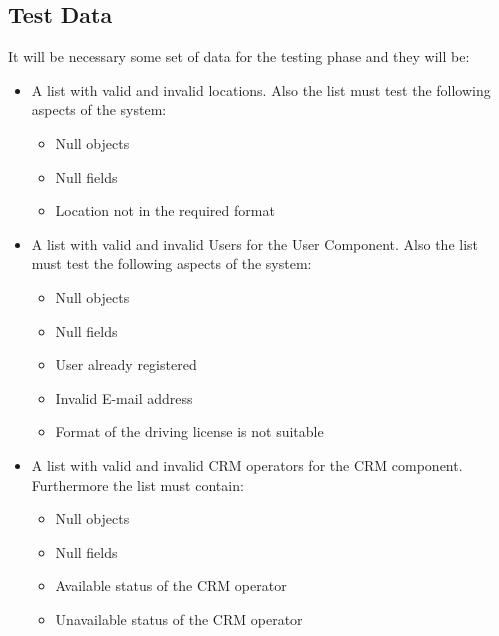 \documentclass[a4paper]{article}
\begin{document}
\subsection{Test Data}
It will be necessary some set of data for the testing phase and they will be:
\begin{itemize}
\item A list with valid and invalid  locations. Also the list must test the following aspects of the system:
\begin{itemize}
     \item Null objects
     \item Null fields
     \item Location not in the required format
   \end{itemize}
\item A list with valid and invalid Users for the User Component. Also the list must test the following aspects of the system:
\begin{itemize}
     \item Null objects
     \item Null fields
     \item User already registered
     \item Invalid E-mail address
     \item Format of the driving license is not suitable   \end{itemize}
\item A list with valid and invalid CRM operators for the CRM component. Furthermore the list must contain:
\begin{itemize}
     \item Null objects
     \item Null fields
     \item Available status of the CRM operator
     \item Unavailable status of the CRM operator   
     \end{itemize}

\end{itemize}  
\newpage
\end{document}

